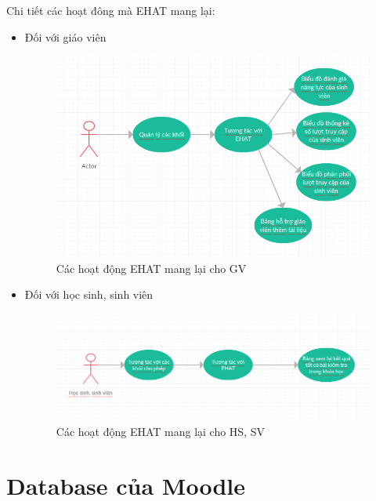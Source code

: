 Chi tiết các hoạt đông mà EHAT mang lại:
\begin{itemize}
	\item Đối với giáo viên
	\begin{center}
		\begin{figure}[htp]
			\begin{center}
				\includegraphics[scale=0.7]{img/chitietehatgv}
			\end{center}
			\caption{Các hoạt động EHAT mang lại cho GV}
			\label{refhinh14}
		\end{figure}
	\end{center}
	\vskip 4cm
	\item Đối với học sinh, sinh viên
	\begin{center}
		\begin{figure}[htp]
			\begin{center}
				\includegraphics[scale=0.7]{img/chitietehaths}
			\end{center}
			\caption{Các hoạt động EHAT mang lại cho HS, SV}
			\label{refhinh15}
		\end{figure}
	\end{center}
\end{itemize}

\newpage
\section{Database của Moodle}

